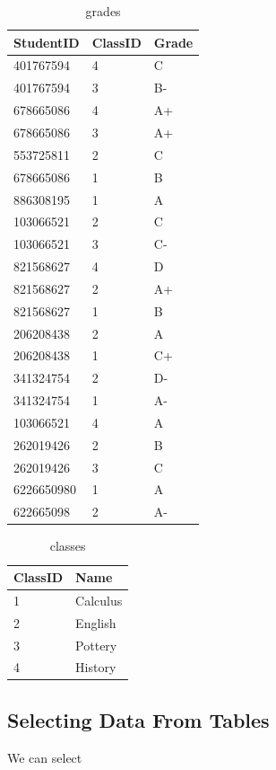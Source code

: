 \begin{problem}
\begin{table}[H]
\begin{tabular}{|l|l|l|}
\hline
StudentID & ClassID & Grade \\
\hline
401767594 & 4 & C \\
401767594 & 3 & B- \\
678665086 & 4 & A+ \\
678665086 & 3 & A+ \\
553725811 & 2 & C \\
678665086 & 1 & B \\
886308195 & 1 & A \\
103066521 & 2 & C \\
103066521 & 3 & C- \\
821568627 & 4 & D \\
821568627 & 2 & A+ \\
821568627 & 1 & B \\
206208438 & 2 & A \\
206208438 & 1 & C+ \\
341324754 & 2 & D- \\
341324754 & 1 & A- \\
103066521 & 4 & A \\
262019426 & 2 & B \\
262019426 & 3 & C \\
6226650980 & 1 & A \\
622665098 & 2 & A- \\
\hline
\end{tabular}
\caption{grades}
\end{table}

\begin{table}[H]
\begin{tabular}{|l|l|}
\hline
ClassID & Name \\
\hline
1 & Calculus \\
2 & English \\
3 & Pottery \\
4 & History \\
\hline
\end{tabular}
\caption{classes}
\end{table}

\end{problem}


\subsection*{Selecting Data From Tables}
We can select

